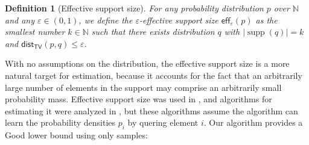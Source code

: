 \documentclass[10pt,a4paper]{article}
\newtheorem{definition}{Definition}[section]
\DeclareMathOperator{\supp}{supp}   %
\newcommand{\dist}{\mathsf{dist}}
\newcommand{\bN}{\ensuremath{\mathbb{N}}}
\newcommand{\TV}{\mathsf{TV}}
\newcommand{\eff}{\mathsf{eff}}
\renewcommand{\epsilon}{\varepsilon}
\begin{document}
\begin{definition}[Effective support size]
\label{def:effective}
For any probability distribution $p$ over $\bN$ and any $\epsilon \in (0,1)$, we define the
\emph{$\epsilon$-effective support size} $\eff_\epsilon(p)$ as the smallest number $k \in \bN$
such that there exists distribution $q$ with $|\supp(q)|=k$ and $\dist_\TV(p,q) \leq \epsilon$.
\end{definition}

\noindent
With no assumptions on the distribution, the effective support size is a more natural target for
estimation, because it accounts for the fact that an arbitrarily large number of elements in the
support may comprise an arbitrarily small probability mass. Effective support size was used in
\cite{CDS18,BCG19}, and algorithms for estimating it were analyzed in \cite{Gol19vdf,NT23,Gol25},
but these algorithms assume the algorithm can learn the probability densities $p_i$ by quering
element $i$. Our algorithm provides a Good lower bound using only samples:
\end{document}
